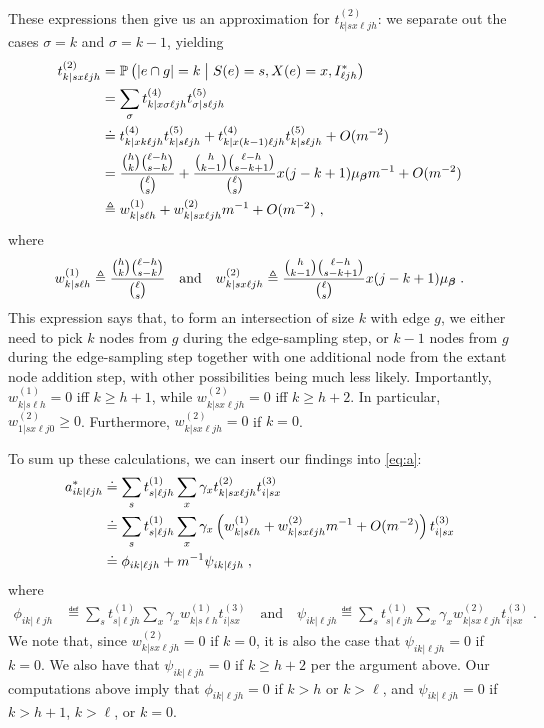 These expressions then give us an approximation for $t^{(2)}_{k|sx\ell jh}$: we separate out the cases $\sigma = k$ and $\sigma = k-1$, yielding
\begin{align}
    t^{(2)}_{k|sx\ell jh} &= \prob{\abs{e\cap g} = k \given S(e) = s, X(e) = x, I^*_{\ell j h}}  \\
    &= \sum_{\sigma} t^{(4)}_{k|x\sigma\ell jh} t^{(5)}_{\sigma|s\ell jh}  \\
    &\doteq t^{(4)}_{k|xk\ell jh} t^{(5)}_{k|s\ell jh} + t^{(4)}_{k|x(k-1)\ell jh} t^{(5)}_{k|s\ell jh} + O(m^{-2})  \\
    &= \frac{\binom{h}{k}\binom{\ell - h}{s - k}}{\binom{\ell}{s}} + \frac{\binom{h}{k-1}\binom{\ell - h}{s - k+1}}{\binom{\ell}{s}} x(j - k + 1)\mu_{\vbeta} m^{-1} + O(m^{-2})\\ 
    &\eqdef w^{(1)}_{k|s\ell h} + w^{(2)}_{k|sx\ell jh}m^{-1} + O(m^{-2})\;, \label{eq:t2}
\end{align}
where 
\begin{align}
    w^{(1)}_{k|s\ell h} \triangleq \frac{\binom{h}{k}\binom{\ell - h}{s - k}}{\binom{\ell}{s}} \quad \text{and} \quad 
    w^{(2)}_{k|sx\ell jh} \triangleq \frac{\binom{h}{k-1}\binom{\ell - h}{s - k+1}}{\binom{\ell}{s}} x(j - k + 1)\mu_{\boldsymbol{\beta}}\;. \label{eq:w1-and-w2}
\end{align}
This expression says that, to form an intersection of size $k$ with edge $g$, we either need to pick $k$ nodes from $g$ during the edge-sampling step, or $k-1$ nodes from $g$ during the edge-sampling step together with one additional node from the extant node addition step, with other possibilities being much less likely. 
Importantly, $w^{(1)}_{k|s\ell h} = 0$ iff $k \geq h+1$, while $w^{(2)}_{k|sx\ell jh} = 0$ iff $k \geq h+2$.
In particular, $w^{(2)}_{1|sx\ell j0} \geq 0$. 
Furthermore, $w^{(2)}_{k|sx\ell jh} = 0$ if $k = 0$. 

To sum up these calculations, we can insert our findings into \eqref{eq:a}:  
\begin{align}
    a^*_{ik|\ell jh } &\doteq \sum_{s} t^{(1)}_{s|\ell jh} \sum_{x} \gamma_x  t^{(2)}_{k|sx\ell jh} t^{(3)}_{i|sx} \\ 
    &\doteq\sum_{s} t^{(1)}_{s|\ell jh} \sum_{x} \gamma_x \left(w^{(1)}_{k|s\ell h} + w^{(2)}_{k|sx\ell jh}m^{-1} + O(m^{-2})\right) t^{(3)}_{i|sx}  \\
    &\doteq \phi_{ik|\ell jh} + m^{-1}\psi_{ik|\ell jh} \;, 
\end{align}
where 
\begin{align}
    \phi_{ik|\ell jh} &\eqdef \sum_{s} t^{(1)}_{s|\ell jh} \sum_{x} \gamma_x w^{(1)}_{k|s\ell h} t^{(3)}_{i|sx} \quad \text{and} \quad 
    \psi_{ik|\ell jh} \eqdef \sum_{s} t^{(1)}_{s|\ell jh} \sum_{x} \gamma_x w^{(2)}_{k|sx\ell jh} t^{(3)}_{i|sx}\;.
\end{align}
We note that, since  $w^{(2)}_{k|sx\ell jh} = 0$ if $k = 0$, it is also the case that $\psi_{ik|\ell jh} = 0$ if $k = 0$.
We also have that $\psi_{ik|\ell jh} = 0$ if $k \geq h + 2$ per the argument above. 
Our computations above imply that $\phi_{ik|\ell jh} = 0$ if $k > h$ or $k > \ell$, and $\psi_{ik|\ell jh} = 0$ if $k > h+1$,  $k > \ell$, or $k = 0$. 

